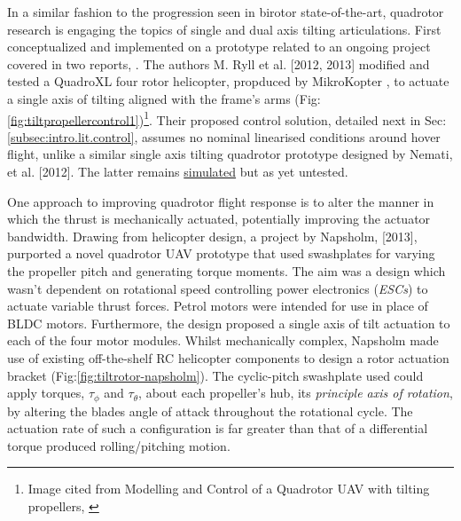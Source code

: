 \par
In a similar fashion to the progression seen in birotor state-of-the-art, quadrotor research is engaging the topics of single and dual axis tilting articulations. First conceptualized and implemented on a prototype related to an ongoing project covered in two reports, \cite{tiltpropellercontrol,tiltpropellerflight}. The authors M. Ryll et al. [2012, 2013] modified and tested a QuadroXL four rotor helicopter, propduced by MikroKopter \cite{mikrokopter}, to actuate a single axis of tilting aligned with the frame's arms (Fig:\ref{fig:tiltpropellercontrol1})\footnote{Image cited from Modelling and Control of a Quadrotor UAV with tilting propellers, \cite{tiltpropellercontrol}}. Their proposed control solution, detailed next in Sec:\ref{subsec:intro.lit.control}, assumes no nominal linearised conditions around hover flight, unlike a similar single axis tilting quadrotor prototype designed by Nemati, et al. [2012]\cite{singleaxistilting}. The latter remains \underline{simulated} but as yet untested.
\par
One approach to improving quadrotor flight response is to alter the manner in which the thrust is mechanically actuated, potentially improving the actuator bandwidth. Drawing from helicopter design, a project by Napsholm, [2013]\cite{napsholm}, purported a novel quadrotor UAV prototype that used swashplates for varying the propeller pitch and generating torque moments. The aim was a design which wasn't dependent on rotational speed controlling power electronics (\emph{ESCs}) to actuate variable thrust forces. Petrol motors were intended for use in place of BLDC motors. Furthermore, the design proposed a single axis of tilt actuation to each of the four motor modules. Whilst mechanically complex, Napsholm made use of existing off-the-shelf RC helicopter components to design a rotor actuation bracket (Fig:\ref{fig:tiltrotor-napsholm}). The cyclic-pitch swashplate used \cite{autonomousrobotspitch} could apply torques, $\tau_{\phi}$ and $\tau_{\theta}$, about each propeller's hub, its \emph{principle axis of rotation}, by altering the blades angle of attack throughout the rotational cycle. The actuation rate of such a configuration is far greater than that of a differential torque produced rolling/pitching motion.
